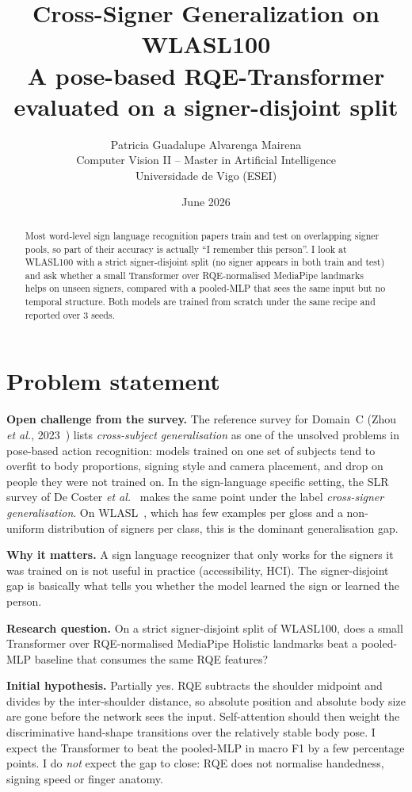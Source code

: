 \documentclass[11pt,a4paper]{article}
\title{\vspace{-1.2cm}\textbf{Cross-Signer Generalization on WLASL100}\\
\large A pose-based RQE-Transformer evaluated on a signer-disjoint split}
\author{Patricia Guadalupe Alvarenga Mairena\\
Computer Vision II -- Master in Artificial Intelligence\\
Universidade de Vigo (ESEI)}
\date{June 2026}
\begin{document}
\maketitle

\begin{abstract}
Most word-level sign language recognition papers train and test on overlapping signer pools, so part of their accuracy is actually ``I remember this person''. I look at WLASL100 with a strict signer-disjoint split (no signer appears in both train and test) and ask whether a small Transformer over RQE-normalised MediaPipe landmarks helps on unseen signers, compared with a pooled-MLP that sees the same input but no temporal structure. Both models are trained from scratch under the same recipe and reported over 3 seeds.
\end{abstract}

\section{Problem statement}

\textbf{Open challenge from the survey.} The reference survey for Domain~C (Zhou \emph{et al.}, 2023~\cite{zhou2023}) lists \emph{cross-subject generalisation} as one of the unsolved problems in pose-based action recognition: models trained on one set of subjects tend to overfit to body proportions, signing style and camera placement, and drop on people they were not trained on. In the sign-language specific setting, the SLR survey of De Coster \emph{et al.}~\cite{decoster2023survey} makes the same point under the label \emph{cross-signer generalisation}. On WLASL~\cite{li2020}, which has few examples per gloss and a non-uniform distribution of signers per class, this is the dominant generalisation gap.

\textbf{Why it matters.} A sign language recognizer that only works for the signers it was trained on is not useful in practice (accessibility, HCI). The signer-disjoint gap is basically what tells you whether the model learned the sign or learned the person.

\textbf{Research question.} On a strict signer-disjoint split of WLASL100, does a small Transformer over RQE-normalised MediaPipe Holistic landmarks beat a pooled-MLP baseline that consumes the same RQE features?

\textbf{Initial hypothesis.} Partially yes. RQE subtracts the shoulder midpoint and divides by the inter-shoulder distance, so absolute position and absolute body size are gone before the network sees the input. Self-attention should then weight the discriminative hand-shape transitions over the relatively stable body pose. I expect the Transformer to beat the pooled-MLP in macro F1 by a few percentage points. I do \emph{not} expect the gap to close: RQE does not normalise handedness, signing speed or finger anatomy.
\end{document}
